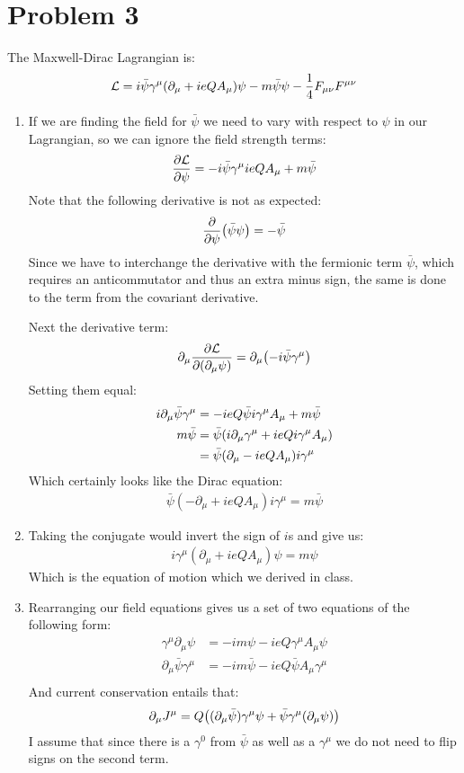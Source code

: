 \documentclass[12pt]{article}
\renewcommand{\L}{\mathcal{L}}
\newcommand{\D}{\partial}
\newcommand{\munu}{{\mu\nu}}
\begin{document}
\section*{Problem 3}
The Maxwell-Dirac Lagrangian is:
\begin{align*}
  \L=i\bar{\psi}\gamma^\mu\qty(\D_\mu+ieQA_\mu)\psi-
  m\bar{\psi}\psi-\frac{1}{4}F_\munu F^\munu
\end{align*}
\begin{enumerate}[label=\alph*)]
\item If we are finding the field for $\bar{\psi}$ we need to vary with respect to $\psi$ in our Lagrangian, so we can ignore the field strength terms:
  \begin{align*}
    \pdv{\L}{\psi}=-i\bar{\psi}\gamma^\mu ieQA_\mu+m\bar{\psi}
  \end{align*}
  Note that the following derivative is not as expected:
  \begin{align*}
    \pdv{\psi}\qty(\bar{\psi}\psi)=-\bar{\psi}
  \end{align*}
  Since we have to interchange the derivative with the fermionic term $\bar{\psi}$, which requires an anticommutator and thus an extra minus sign, the same is done to the term from the covariant derivative.

  Next the derivative term:
  \begin{align*}
    \D_\mu\pdv{\L}{(\D_\mu\psi)}=\D_{\mu}\qty(-i\bar{\psi}\gamma^\mu)
  \end{align*}
  Setting them equal:
  \begin{align*}
    i\D_\mu\bar{\psi}\gamma^\mu&=-ieQ\bar{\psi}i\gamma^\mu A_\mu+m\bar{\psi}\\
    m\bar{\psi}&=\bar{\psi}\qty(i\D_\mu\gamma^\mu+ieQi\gamma^\mu A_\mu)\\
    &=\bar{\psi}(\D_\mu-ieQA_\mu)i\gamma^\mu
  \end{align*}
  Which certainly looks like the Dirac equation:
  \begin{align*}
    \bar{\psi}(-\D_\mu+ieQA_\mu)i\gamma^\mu=m\bar{\psi}
  \end{align*}
\item Taking the conjugate would invert the sign of $i$s and give us:
  \begin{align*}
    i\gamma^\mu(\D_\mu+ieQA_\mu)\psi=m\psi
  \end{align*}
  Which is the equation of motion which we derived in class.
\item Rearranging our field equations gives us a set of two equations of the following form:
  \begin{align*}
    \gamma^\mu\D_\mu\psi&=-im\psi-ieQ\gamma^\mu A_\mu\psi\\
    \D_\mu\bar{\psi}\gamma^\mu&=-im\bar{\psi}-ieQ\bar{\psi}A_\mu\gamma^\mu \\
  \end{align*}
  And current conservation entails that:
  \begin{align*}
    \D_\mu J^\mu=Q\qty((\D_\mu\bar{\psi})\gamma^\mu\psi
    +\bar{\psi}\gamma^\mu\qty(\D_\mu\psi))
  \end{align*}
  I assume that since there is a $\gamma^0$ from $\bar{\psi}$ as well as a $\gamma^\mu$ we do not need to flip signs on the second term.


\end{enumerate}
\end{document}
